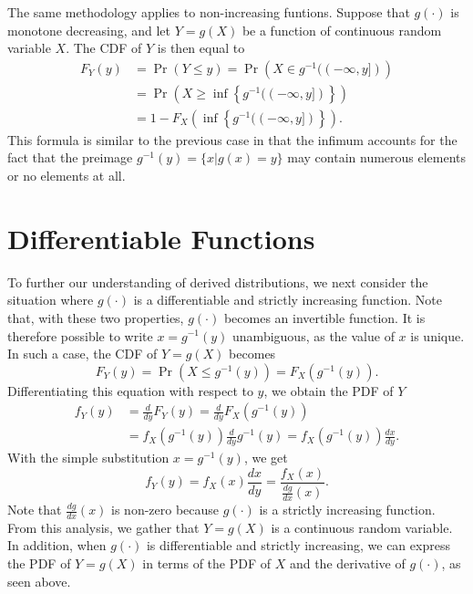 The same methodology applies to non-increasing funtions.
Suppose that $g(\cdot)$ is monotone decreasing, and let $Y = g(X)$ be a function of continuous random variable $X$.
The CDF of $Y$ is then equal to
\begin{equation} \label{equation:MonotoneDecreasingCDF}
\begin{split}
F_Y(y) &= \Pr (Y \leq y) = \Pr \left( X \in g^{-1} ((-\infty, y]) \right) \\
&= \Pr \left( X \geq \inf \left\{ g^{-1} ((-\infty, y]) \right\} \right) \\
&= 1 - F_X \left( \inf \left\{ g^{-1} ((-\infty, y] ) \right\} \right) .
\end{split}
\end{equation}
This formula is similar to the previous case in that the infimum accounts for the fact that the preimage $g^{-1}(y) = \{ x | g(x) = y \}$ may contain numerous elements or no elements at all.


\section{Differentiable Functions}

To further our understanding of derived distributions, we next consider the situation where $g(\cdot)$ is a differentiable and strictly increasing function.
Note that, with these two properties, $g(\cdot)$ becomes an invertible function.
It is therefore possible to write $x = g^{-1} (y)$ unambiguous, as the value of $x$ is unique.
In such a case, the CDF of $Y = g(X)$ becomes
\begin{equation*}
F_Y(y) = \Pr \left( X \leq g^{-1}(y) \right)
= F_X \left( g^{-1} (y) \right) .
\end{equation*}
Differentiating this equation with respect to $y$, we obtain the PDF of $Y$
\begin{equation*}
\begin{split}
f_Y (y) &= \frac{d}{dy} F_Y(y)
= \frac{d}{dy} F_X \left( g^{-1} (y) \right) \\
&= f_X \left( g^{-1} (y) \right) \frac{d}{dy} g^{-1} (y)
= f_X \left( g^{-1} (y) \right) \frac{dx}{dy} .
\end{split}
\end{equation*}
With the simple substitution $x = g^{-1} (y)$, we get
\begin{equation*}
f_Y (y) = f_X (x) \frac{dx}{dy}
= \frac{f_X (x)}{\frac{dg}{dx}(x)} .
\end{equation*}
Note that $\frac{dg}{dx} (x)$ is non-zero because $g(\cdot)$ is a strictly increasing function.
From this analysis, we gather that $Y=g(X)$ is a continuous random variable.
In addition, when $g(\cdot)$ is differentiable and strictly increasing, we can express the PDF of $Y = g(X)$ in terms of the PDF of $X$ and the derivative of $g(\cdot)$, as seen above.

